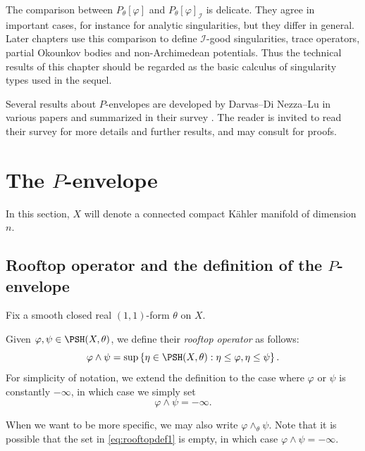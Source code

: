 The comparison between $P_\theta[\varphi]$ and $P_\theta[\varphi]_{\mathcal I}$ is delicate. They agree in important cases, for instance for analytic singularities, but they differ in general. Later chapters use this comparison to define $\mathcal I$-good singularities, trace operators, partial Okounkov bodies and non-Archimedean potentials. Thus the technical results of this chapter should be regarded as the basic calculus of singularity types used in the sequel.

Several results about $P$-envelopes are developed by Darvas--Di Nezza--Lu in various papers and summarized in their survey \cite{DDNLsurv}. The reader is invited to read their survey for more details and further results, and may consult \cite[Chapters~16--17]{FPT} for proofs.

\section{The \texorpdfstring{$P$}{P}-envelope}\label{sec:Penv}
In this section, $X$ will denote a connected compact Kähler manifold of dimension $n$.


\subsection{Rooftop operator and the definition of the \texorpdfstring{$P$}{P}-envelope}
\label{subsec:rooftop_Penv}

Fix a smooth closed real $(1,1)$-form $\theta$ on $X$.


\begin{definition}\label{def:rooftop}
    Given $\varphi,\psi\in \PSH(X,\theta)$, we define their \emph{rooftop operator} as follows:
    \begin{equation}\label{eq:rooftopdef1}
    \varphi\land\psi=\sup\left\{\eta\in \PSH(X,\theta):\eta\leq \varphi,\eta\leq \psi\right\}.
    \end{equation}
    \index{$\varphi\land \psi$}
    For simplicity of notation, we extend the definition to the case where $\varphi$ or $\psi$ is constantly $-\infty$, in which case we simply set
    \[
    \varphi\land \psi=-\infty.
    \]
\end{definition}
When we want to be more specific, we may also write $\varphi\land_{\theta}\psi$. Note that it is possible that the set in \eqref{eq:rooftopdef1} is empty, in which case $\varphi\land \psi=-\infty$.


